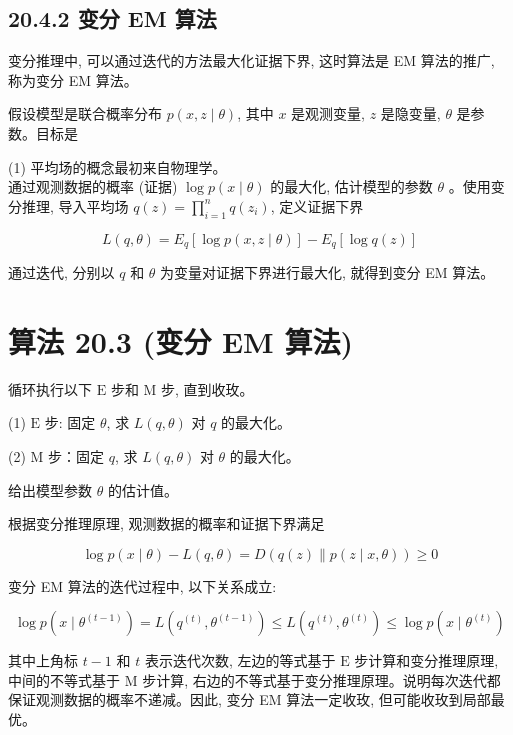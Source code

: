 \documentclass[10pt]{article}
\begin{document}
\begin{CJK*}{UTF8}{bsmi}
\subsection*{20.4.2 变分 EM 算法}
变分推理中, 可以通过迭代的方法最大化证据下界, 这时算法是 EM 算法的推广, 称为变分 EM 算法。

假设模型是联合概率分布 $p(x, z \mid \theta)$, 其中 $x$ 是观测变量, $z$ 是隐变量, $\theta$ 是参数。目标是

(1) 平均场的概念最初来自物理学。\\
通过观测数据的概率 (证据) $\log p(x \mid \theta)$ 的最大化, 估计模型的参数 $\theta$ 。使用变分推理, 导入平均场 $q(z)=\prod_{i=1}^{n} q\left(z_{i}\right)$, 定义证据下界


\begin{equation*}
L(q, \theta)=E_{q}[\log p(x, z \mid \theta)]-E_{q}[\log q(z)] \tag{20.39}
\end{equation*}


通过迭代, 分别以 $q$ 和 $\theta$ 为变量对证据下界进行最大化, 就得到变分 EM 算法。

\section*{算法 20.3 (变分 EM 算法)}
循环执行以下 $\mathrm{E}$ 步和 $\mathrm{M}$ 步, 直到收玫。

(1) $\mathrm{E}$ 步: 固定 $\theta$, 求 $L(q, \theta)$ 对 $q$ 的最大化。

(2) $\mathrm{M}$ 步：固定 $q$, 求 $L(q, \theta)$ 对 $\theta$ 的最大化。

给出模型参数 $\theta$ 的估计值。

根据变分推理原理, 观测数据的概率和证据下界满足


\begin{equation*}
\log p(x \mid \theta)-L(q, \theta)=D(q(z) \| p(z \mid x, \theta)) \geqslant 0 \tag{20.40}
\end{equation*}


变分 EM 算法的迭代过程中, 以下关系成立:


\begin{equation*}
\log p\left(x \mid \theta^{(t-1)}\right)=L\left(q^{(t)}, \theta^{(t-1)}\right) \leqslant L\left(q^{(t)}, \theta^{(t)}\right) \leqslant \log p\left(x \mid \theta^{(t)}\right) \tag{20.41}
\end{equation*}


其中上角标 $t-1$ 和 $t$ 表示迭代次数, 左边的等式基于 $\mathrm{E}$ 步计算和变分推理原理, 中间的不等式基于 $\mathrm{M}$ 步计算, 右边的不等式基于变分推理原理。说明每次迭代都保证观测数据的概率不递减。因此, 变分 EM 算法一定收玫, 但可能收玫到局部最优。


\end{CJK*}
\end{document}
